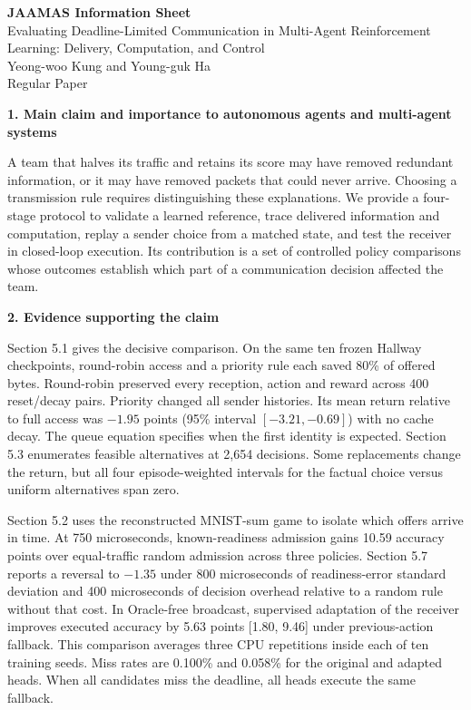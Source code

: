 \documentclass[11pt,a4paper]{article}
\begin{document}
\begin{center}\large\textbf{JAAMAS Information Sheet}\\[5pt]\normalsize
Evaluating Deadline-Limited Communication in Multi-Agent Reinforcement Learning: Delivery, Computation, and Control\\[5pt]
Yeong-woo Kung and Young-guk Ha\\Regular Paper
\end{center}
\textbf{1. Main claim and importance to autonomous agents and multi-agent systems}

A team that halves its traffic and retains its score may have removed redundant information, or it may have removed packets that could never arrive. Choosing a transmission rule requires distinguishing these explanations. We provide a four-stage protocol to validate a learned reference, trace delivered information and computation, replay a sender choice from a matched state, and test the receiver in closed-loop execution. Its contribution is a set of controlled policy comparisons whose outcomes establish which part of a communication decision affected the team.

\textbf{2. Evidence supporting the claim}

Section 5.1 gives the decisive comparison. On the same ten frozen Hallway checkpoints, round-robin access and a priority rule each saved 80\% of offered bytes. Round-robin preserved every reception, action and reward across 400 reset/decay pairs. Priority changed all sender histories. Its mean return relative to full access was $-1.95$ points (95\% interval $[-3.21,-0.69]$) with no cache decay. The queue equation specifies when the first identity is expected. Section 5.3 enumerates feasible alternatives at 2,654 decisions. Some replacements change the return, but all four episode-weighted intervals for the factual choice versus uniform alternatives span zero.

Section 5.2 uses the reconstructed MNIST-sum game to isolate which offers arrive in time. At 750 microseconds, known-readiness admission gains 10.59 accuracy points over equal-traffic random admission across three policies. Section 5.7 reports a reversal to $-1.35$ under 800 microseconds of readiness-error standard deviation and 400 microseconds of decision overhead relative to a random rule without that cost. In Oracle-free broadcast, supervised adaptation of the receiver improves executed accuracy by 5.63 points [1.80, 9.46] under previous-action fallback. This comparison averages three CPU repetitions inside each of ten training seeds. Miss rates are 0.100\% and 0.058\% for the original and adapted heads. When all candidates miss the deadline, all heads execute the same fallback.
\end{document}
